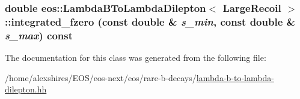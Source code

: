\label{classeos_1_1LambdaBToLambdaDilepton_3_01LargeRecoil_01_4_a83fa63546f5fc4c9e49ea542fa2ca903}
\hypertarget{classeos_1_1LambdaBToLambdaDilepton_3_01LargeRecoil_01_4_a309b1c0c5d175cd306ed76404d00f5f8}{
\subsubsection[{integrated\_\-fzero}]{\setlength{\rightskip}{0pt plus 5cm}double eos::LambdaBToLambdaDilepton$<$ {\bf LargeRecoil} $>$::integrated\_\-fzero (const double \& {\em s\_\-min}, \/  const double \& {\em s\_\-max}) const}}
\label{classeos_1_1LambdaBToLambdaDilepton_3_01LargeRecoil_01_4_a309b1c0c5d175cd306ed76404d00f5f8}


The documentation for this class was generated from the following file:\begin{DoxyCompactItemize}
\item 
/home/alexshires/EOS/eos-\/next/eos/rare-\/b-\/decays/\hyperlink{lambda-b-to-lambda-dilepton_8hh}{lambda-\/b-\/to-\/lambda-\/dilepton.hh}\end{DoxyCompactItemize}
